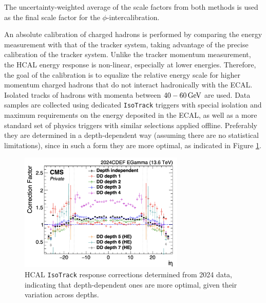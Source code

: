 The uncertainty-weighted average of the scale factors from both methods is used as the final scale factor for the $\phi$-intercalibration.

An absolute calibration of charged hadrons is performed by comparing the energy measurement with that of the tracker system, taking advantage of the precise calibration of the tracker system. Unlike the tracker momentum measurement, the HCAL energy response is non-linear, especially at lower energies. Therefore, the goal of the calibration is to equalize the relative energy scale for higher momentum charged hadrons that do not interact hadronically with the ECAL. Isolated tracks of hadrons with momenta between $40-60 \,\text{Ge\hspace{-.08em}V}$ are used. Data samples are collected using dedicated \texttt{IsoTrack} triggers with special isolation and maximum requirements on the energy deposited in the ECAL, as well as a more standard set of physics triggers with similar selections applied offline. Preferably they are determined in a depth-dependent way (assuming there are no statistical limitations), since in such a form they are more optimal, as indicated in Figure \ref{fig:HCAL-IsoTrack}.

\begin{figure}[h!]	
\centering
\includegraphics[width=0.7\textwidth]{figures/HCAL_IsoTrack_DepthDependent_2024.png} %
\caption{HCAL \texttt{IsoTrack} response corrections determined from 2024 data, indicating that depth-dependent ones are more optimal, given their variation across depths.} 
\label{fig:HCAL-IsoTrack}
\end{figure}

